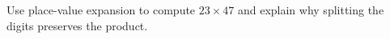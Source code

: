 Use place-value expansion to compute $23\times47$ and explain why splitting the digits preserves the product.
